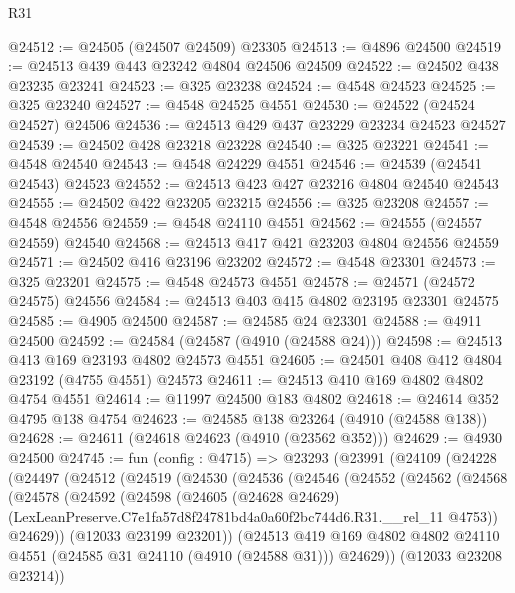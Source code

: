 \begin{lexlean}{R31}
\begin{coremodule}
@24512 := @24505 (@24507 @24509) @23305
@24513 := @4896 @24500
@24519 := @24513 @439 @443 @23242 @4804 @24506 @24509
@24522 := @24502 @438 @23235 @23241
@24523 := @325 @23238
@24524 := @4548 @24523
@24525 := @325 @23240
@24527 := @4548 @24525 @4551
@24530 := @24522 (@24524 @24527) @24506
@24536 := @24513 @429 @437 @23229 @23234 @24523 @24527
@24539 := @24502 @428 @23218 @23228
@24540 := @325 @23221
@24541 := @4548 @24540
@24543 := @4548 @24229 @4551
@24546 := @24539 (@24541 @24543) @24523
@24552 := @24513 @423 @427 @23216 @4804 @24540 @24543
@24555 := @24502 @422 @23205 @23215
@24556 := @325 @23208
@24557 := @4548 @24556
@24559 := @4548 @24110 @4551
@24562 := @24555 (@24557 @24559) @24540
@24568 := @24513 @417 @421 @23203 @4804 @24556 @24559
@24571 := @24502 @416 @23196 @23202
@24572 := @4548 @23301
@24573 := @325 @23201
@24575 := @4548 @24573 @4551
@24578 := @24571 (@24572 @24575) @24556
@24584 := @24513 @403 @415 @4802 @23195 @23301 @24575
@24585 := @4905 @24500
@24587 := @24585 @24 @23301
@24588 := @4911 @24500
@24592 := @24584 (@24587 (@4910 (@24588 @24)))
@24598 := @24513 @413 @169 @23193 @4802 @24573 @4551
@24605 := @24501 @408 @412 @4804 @23192 (@4755 @4551) @24573
@24611 := @24513 @410 @169 @4802 @4802 @4754 @4551
@24614 := @11997 @24500 @183 @4802
@24618 := @24614 @352 @4795 @138 @4754
@24623 := @24585 @138 @23264 (@4910 (@24588 @138))
@24628 := @24611 (@24618 @24623 (@4910 (@23562 @352)))
@24629 := @4930 @24500
@24745 := fun (config : @4715) =>
  @23293
    (@23991
      (@24109
        (@24228
          (@24497
            (@24512
              (@24519
                (@24530
                  (@24536
                    (@24546
                      (@24552
                        (@24562
                          (@24568
                            (@24578
                              (@24592
                                (@24598
                                  (@24605
                                    (@24628 @24629)
                                    (LexLeanPreserve.C7e1fa57d8f24781bd4a0a60f2bc744d6.R31.__rel_11
                                      @4753))
                                  @24629))
                              (@12033 @23199 @23201))
                            (@24513
                              @419
                              @169
                              @4802
                              @4802
                              @24110
                              @4551
                              (@24585 @31 @24110 (@4910 (@24588 @31)))
                              @24629))
                          (@12033 @23208 @23214))

\end{coremodule}
\end{lexlean}
